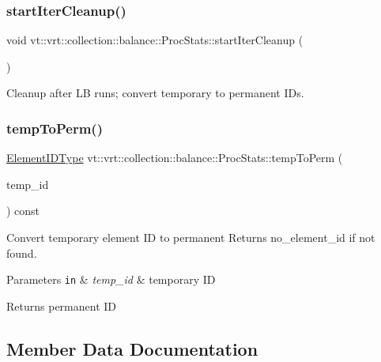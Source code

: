 \subsubsection{\texorpdfstring{start\+Iter\+Cleanup()}{startIterCleanup()}}
{\footnotesize\ttfamily void vt\+::vrt\+::collection\+::balance\+::\+Proc\+Stats\+::start\+Iter\+Cleanup (\begin{DoxyParamCaption}{ }\end{DoxyParamCaption})}



Cleanup after LB runs; convert temporary to permanent I\+Ds. 

\mbox{\label{structvt_1_1vrt_1_1collection_1_1balance_1_1_proc_stats_afed5b2ba3c677167d38ae12c012ff993}} 
\subsubsection{\texorpdfstring{temp\+To\+Perm()}{tempToPerm()}}
{\footnotesize\ttfamily \hyperlink{namespacevt_1_1vrt_1_1collection_1_1balance_a14c8d2c972f2913aa3f1636e5be0a120}{Element\+I\+D\+Type} vt\+::vrt\+::collection\+::balance\+::\+Proc\+Stats\+::temp\+To\+Perm (\begin{DoxyParamCaption}\item[{\hyperlink{namespacevt_1_1vrt_1_1collection_1_1balance_a14c8d2c972f2913aa3f1636e5be0a120}{Element\+I\+D\+Type}}]{temp\+\_\+id }\end{DoxyParamCaption}) const}



Convert temporary element ID to permanent Returns {\ttfamily no\+\_\+element\+\_\+id} if not found. 


\begin{DoxyParams}[1]{Parameters}
\mbox{\tt in}  & {\em temp\+\_\+id} & temporary ID\\
\hline
\end{DoxyParams}
\begin{DoxyReturn}{Returns}
permanent ID 
\end{DoxyReturn}


\subsection{Member Data Documentation}
\mbox{\label{structvt_1_1vrt_1_1collection_1_1balance_1_1_proc_stats_a44e4994b863721b1a20bcd2333a1966b}} 
